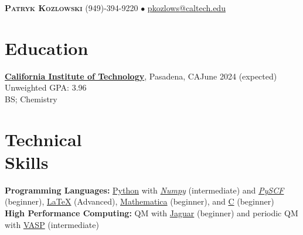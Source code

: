 \documentclass[margin,line]{resume}
\begin{document}
{\Large \textbf{\scshape Patryk Kozlowski}
\normalsize
\hspace{70mm}(949)-394-9220 $\bullet$ \url{pkozlows@caltech.edu}
}
\begin{resume}

\section{\mysidestyle Education}
\textbf{\href{https://www.caltech.edu/}{California Institute of Technology}}, Pasadena, CA\hfill June 2024 (expected)\\
Unweighted GPA: 3.96\\
BS; Chemistry

\section{\mysidestyle Technical\\ Skills}
\textbf{Programming Languages:} \href{https://www.python.org/}{Python} with \emph{\href{https://numpy.org/}{Numpy}} (intermediate) 
and \emph{\href{https://pyscf.org/}{PySCF}} (beginner), \href{https://www.latex-project.org/}{ \LaTeX }  (Advanced), \href{https://www.wolfram.com/mathematica/}{Mathematica} (beginner), and \href{https://en.wikipedia.org/wiki/C_(programming_language)}{C} (beginner)\\
\textbf{High Performance Computing:} QM with \href{https://www.schrodinger.com/products/jaguar}{Jaguar} (beginner) and periodic QM with \href{https://www.vasp.at/}{VASP} (intermediate)


\end{resume}
\end{document}
